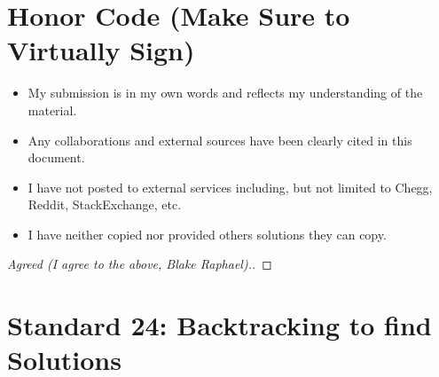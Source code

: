 \documentclass[11pt]{article}
\theoremstyle{definition}
\theoremstyle{definition}
\theoremstyle{definition}
\begin{document}
\section{Honor Code (Make Sure to Virtually Sign)} \label{HonorCode}

\begin{itemize}
\item My submission is in my own words and reflects my understanding of the material.
\item Any collaborations and external sources have been clearly cited in this document.
\item I have not posted to external services including, but not limited to Chegg, Reddit, StackExchange, etc.
\item I have neither copied nor provided others solutions they can copy.
\end{itemize}


\begin{proof}[Agreed (I agree to the above, Blake Raphael).]
\end{proof}
\newpage
\section{Standard 24: Backtracking to find Solutions}
\end{document}
